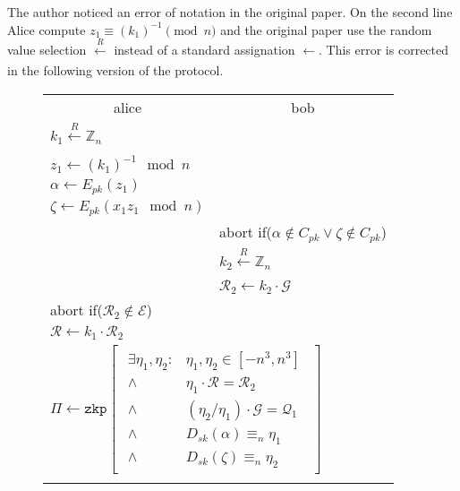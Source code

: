 The author noticed an error of notation in the original paper. On the second
line Alice compute $z_1 \equiv (k_1)^{-1} \pmod n$ and the original paper use
the random value selection $\xleftarrow[]{R}$ instead of a standard assignation
$\leftarrow$. This error is corrected in the following version of the protocol.

\newpage

\begin{figure}[H]
    \begin{table}[H]
      \centering
      \begin{footnotesize}
      {\renewcommand{\arraystretch}{1.2}%
      \begin{tabular}{ | l l | }
        \hline
        \multicolumn{1}{|c}{alice}  & \multicolumn{1}{c|}{bob} \\
        $k_1 \xleftarrow[]{R} \mathbb{Z}_{n}$ & \\
        $z_1 \leftarrow (k_1)^{-1} \mod n$ & \\
        $\alpha \leftarrow E_{pk}(z_1)$ & \\
        $\zeta \leftarrow E_{pk}(x_1z_1 \mod n)$ & \\[2ex]
          & abort if($\alpha \notin C_{pk} \lor \zeta \notin C_{pk}$) \\
          & $k_2 \xleftarrow[]{R} \mathbb{Z}_{n}$ \\
          & $\mathcal{R}_2 \leftarrow k_2 \cdot \mathcal{G}$ \\[2ex]
        abort if($\mathcal{R}_2 \notin \mathcal{E}$) & \\
        $\mathcal{R} \leftarrow k_1 \cdot \mathcal{R}_2$ & \\
        \multicolumn{2}{|l|}{
        $\Pi \leftarrow \texttt{zkp} \begin{bmatrix}\begin{array}{lr}
                                      \exists \eta_1, \eta_2 : & \eta_1, \eta_2 \in [-n^3, n^3] \\
                                      \land & \eta_1 \cdot \mathcal{R} = \mathcal{R}_2 \\
                                      \land & (\eta_2/\eta_1) \cdot \mathcal{G} = \mathcal{Q}_1 \\
                                      \land & D_{sk}(\alpha) \equiv_n \eta_1 \\
                                      \land & D_{sk}(\zeta) \equiv_n \eta_2
                                     \end{array}\end{bmatrix}$ } \\ & \\

\end{tabular}}
\end{footnotesize}
\end{table}
\end{figure}
